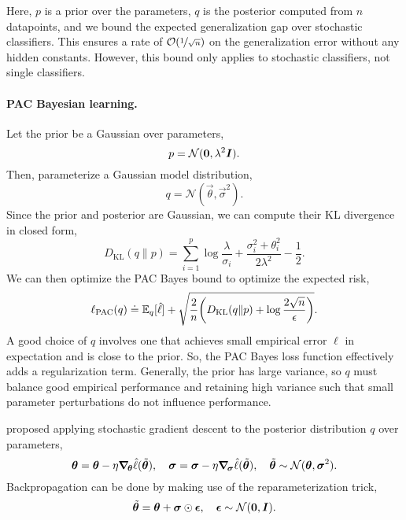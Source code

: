 Here, $p$ is a prior over the parameters, $q$ is the posterior computed from $n$ datapoints, and we
bound the expected generalization gap over stochastic classifiers. This ensures a rate of
$\bigo{\nicefrac{1}{\sqrt{n}}}$ on the generalization error without any hidden constants. However,
this bound only applies to stochastic classifiers, not single classifiers.

\paragraph{PAC Bayesian learning.}

Let the prior be a Gaussian over parameters, \[
    p = \mathcal{N}(\bm{0}, \lambda^2 \bm{I}).
\]
Then, parameterize a Gaussian model distribution, \[
    q = \mathcal{N}(\vec{\theta}, \vec{\sigma}^2).
\]
Since the prior and posterior are Gaussian, we can compute their KL divergence in closed form, \[
    D_{\mathrm{KL}}(q \| p) = \sum_{i=1}^{p} \log \frac{\lambda}{\sigma_i} + \frac{\sigma_i^2 + \theta_i^2}{2 \lambda^2} - \frac{1}{2}.
\]
We can then optimize the PAC Bayes bound to optimize the expected risk, \[
    \ell_{\mathrm{PAC}}(q) \doteq \E_q[\hat{\ell}] + \sqrt{\frac{2}{n} \lft( D_{\mathrm{KL}}(q \| p) + \log \frac{2 \sqrt{n}}{\epsilon} \rgt)}.
\]
A good choice of $q$ involves one that achieves small empirical error $\hat{\ell}$ in expectation
and is close to the prior. So, the PAC Bayes loss function effectively adds a regularization term.
Generally, the prior has large variance, so $q$ must balance good empirical performance and
retaining high variance such that small parameter perturbations do not influence performance.

\citet{dziugaite2017computing} proposed applying stochastic gradient descent to the posterior distribution $q$ over parameters, \[
    \bm{\theta} = \bm{\theta} - \eta \bm{\nabla}_{\! \bm{\theta}} \hat{\ell}(\tilde{\bm{\theta}}), \quad \bm{\sigma} = \bm{\sigma} - \eta \bm{\nabla}_{\! \bm{\sigma}} \hat{\ell}(\tilde{\bm{\theta}}), \quad \tilde{\bm{\theta}} \sim \mathcal{N}(\bm{\theta}, \bm{\sigma}^2).
\]
Backpropagation can be done by making use of the reparameterization trick, \[
    \tilde{\bm{\theta}} = \bm{\theta} + \bm{\sigma} \odot \bm{\epsilon}, \quad \bm{\epsilon} \sim \mathcal{N}(\bm{0}, \bm{I}).
\]
